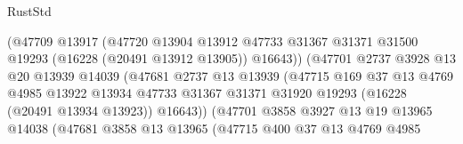 \begin{lexlean}{RustStd}
\begin{coremodule}
                                    (@47709
                                      @13917
                                      (@47720
                                        @13904
                                        @13912
                                        @47733
                                        @31367
                                        @31371
                                        @31500
                                        @19293
                                        (@16228 (@20491 @13912 @13905))
                                        @16643))
                                    (@47701
                                      @2737
                                      @3928
                                      @13
                                      @20
                                      @13939
                                      @14039
                                      (@47681
                                        @2737
                                        @13
                                        @13939
                                        (@47715
                                          @169
                                          @37
                                          @13
                                          @4769
                                          @4985
                                          @13922
                                          @13934
                                          @47733
                                          @31367
                                          @31371
                                          @31920
                                          @19293
                                          (@16228 (@20491 @13934 @13923))
                                          @16643))
                                      (@47701
                                        @3858
                                        @3927
                                        @13
                                        @19
                                        @13965
                                        @14038
                                        (@47681
                                          @3858
                                          @13
                                          @13965
                                          (@47715
                                            @400
                                            @37
                                            @13
                                            @4769
                                            @4985

\end{coremodule}
\end{lexlean}
